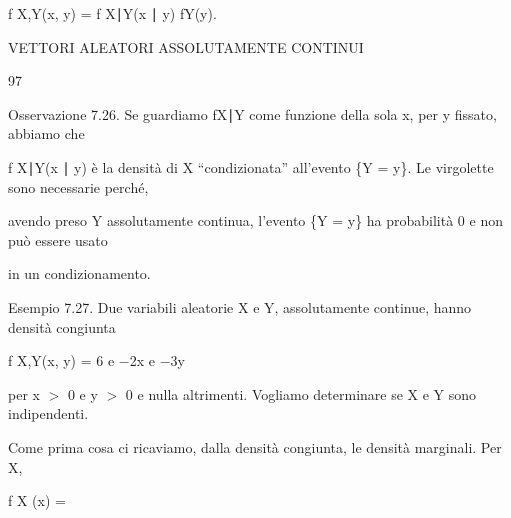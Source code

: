 \documentclass[a4paper,portrait,12pt]{article}
\begin{document}
\begin{flushleft}
f X,Y(x, y) = f X∣Y(x ∣ y) fY(y).
\end{flushleft}





\begin{flushleft}
 VETTORI ALEATORI ASSOLUTAMENTE CONTINUI
\end{flushleft}





97





\begin{flushleft}
Osservazione 7.26. Se guardiamo fX∣Y come funzione della sola x, per y fissato, abbiamo che
\end{flushleft}


\begin{flushleft}
f X∣Y(x ∣ y) \`{e} la densit\`{a} di X {``}condizionata'' all'evento \{Y = y\}. Le virgolette sono necessarie perch\'{e},
\end{flushleft}


\begin{flushleft}
avendo preso Y assolutamente continua, l'evento \{Y = y\} ha probabilit\`{a} 0 e non pu\`{o} essere usato
\end{flushleft}


\begin{flushleft}
in un condizionamento.
\end{flushleft}


\begin{flushleft}
Esempio 7.27. Due variabili aleatorie X e Y, assolutamente continue, hanno densit\`{a} congiunta
\end{flushleft}


\begin{flushleft}
f X,Y(x, y) = 6 e $-$2x e $-$3y
\end{flushleft}


\begin{flushleft}
per x $>$ 0 e y $>$ 0 e nulla altrimenti. Vogliamo determinare se X e Y sono indipendenti.
\end{flushleft}


\begin{flushleft}
Come prima cosa ci ricaviamo, dalla densit\`{a} congiunta, le densit\`{a} marginali. Per X,
\end{flushleft}


\begin{flushleft}
f X (x) =
\end{flushleft}
\end{document}
